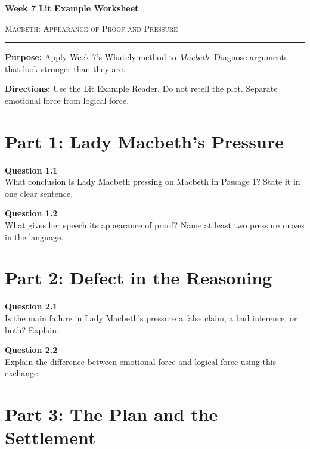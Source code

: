 \documentclass[12pt]{article}
\begin{document}
\begin{center}
{\LARGE\bfseries Week 7 Lit Example Worksheet}\par\vspace{0.05em}
{\large\scshape Macbeth: Appearance of Proof and Pressure}\par\vspace{0.12em}
\rule{0.78\textwidth}{0.5pt}
\end{center}

\textbf{Purpose:} Apply Week 7's Whately method to \textit{Macbeth}. Diagnose arguments that look stronger than they are.

\textbf{Directions:} Use the Lit Example Reader. Do not retell the plot. Separate emotional force from logical force.

\section*{Part 1: Lady Macbeth's Pressure}

\textbf{Question 1.1}\\[-0.15em]
What conclusion is Lady Macbeth pressing on Macbeth in Passage 1? State it in one clear sentence.


\textbf{Question 1.2}\\[-0.15em]
What gives her speech its appearance of proof? Name at least two pressure moves in the language.


\newpage

\section*{Part 2: Defect in the Reasoning}

\textbf{Question 2.1}\\[-0.15em]
Is the main failure in Lady Macbeth's pressure a false claim, a bad inference, or both? Explain.


\textbf{Question 2.2}\\[-0.15em]
Explain the difference between emotional force and logical force using this exchange.


\newpage

\section*{Part 3: The Plan and the Settlement}
\end{document}
